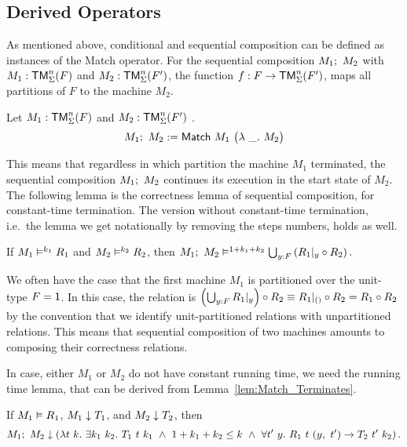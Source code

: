 \subsection{Derived Operators}
\label{sec:match-derived-operators}

As mentioned above, conditional and sequential composition can be defined as instances of the Match operator.  For the sequential composition
$M_1 ;~ M_2$ with $M_1 : \mathsf{TM}_\Sigma^n(F)$ and $M_2 : \mathsf{TM}_\Sigma^n(F')$, the function $f : F \rightarrow \mathsf{TM}_\Sigma^n(F')$, maps all partitions of $F$ to the
machine $M_2$.
%
\begin{definition}
  \label{def:Seq}
  Let $M_1 : \mathsf{TM}_\Sigma^n(F)$ and $M_2 : \mathsf{TM}_\Sigma^n(F')$ .
  \[
    M_1 ;~ M_2 := \mathsf{Match}~M_1~
    \bigl(
    \lambda~\_.~M_2
    \bigr)
  \]
\end{definition}
This means that regardless in which partition the machine $M_1$ terminated, the sequential composition $M_1 ;~ M_2$ continues its execution in the
start state of $M_2$.  The following lemma is the correctness lemma of sequential composition, for constant-time termination.  The version without
constant-time termination, i.e.\ the lemma we get notationally by removing the steps numbers, holds as well.

\begin{lemma}
  \label{lem:Seq_RealiseIn}
  If $M_1 \mathrel{\vDash^{k_1}} R_1$ and $M_2 \mathrel{\vDash^{k_2}} R_2$, then
  $
  M_1 ;~ M_2 \mathrel{\vDash^{1+k_1+k_2}} \bigcup_{y:F} \left(R_1{|}_{y} \circ R_2 \right).
  $
\end{lemma}

We often have the case that the first machine $M_1$ is partitioned over the unit-type $F = \mathsf{1}$.  In this case, the relation is
$\left(\bigcup_{y:F} R_1{|}_{y}\right) \circ R_2 \equiv R_1 {|}_{\mathsf{()}} \circ R_2 = R_1 \circ R_2$ by the convention that we identify unit-partitioned
relations with unpartitioned relations.  This means that sequential composition of two machines amounts to composing their correctness relations.

In case, either $M_1$ or $M_2$ do not have constant running time, we need the running time lemma, that can be derived from Lemma~\ref{lem:Match_Terminates}.
\begin{lemma}
  \label{lem:Seq_TerminatesIn}
  If $M_1 \mathrel{\vDash} R_1$, $M_1 \mathrel{\downarrow} T_1$, and $M_2 \mathrel{\downarrow} T_2$, then
  \[
    M_1 \Seq M_2 \TerminatesIn
    \left(%
      \lambda t~k.~\exists k_1~k_2.~T_1~t~k_1 ~\land~ 1 + k_1 + k_2 \leq k ~\land~ \forall t'~y.~R_1~t~(y,~t') \rightarrow T_2~t'~k_2 %
    \right).
  \]
\end{lemma}


